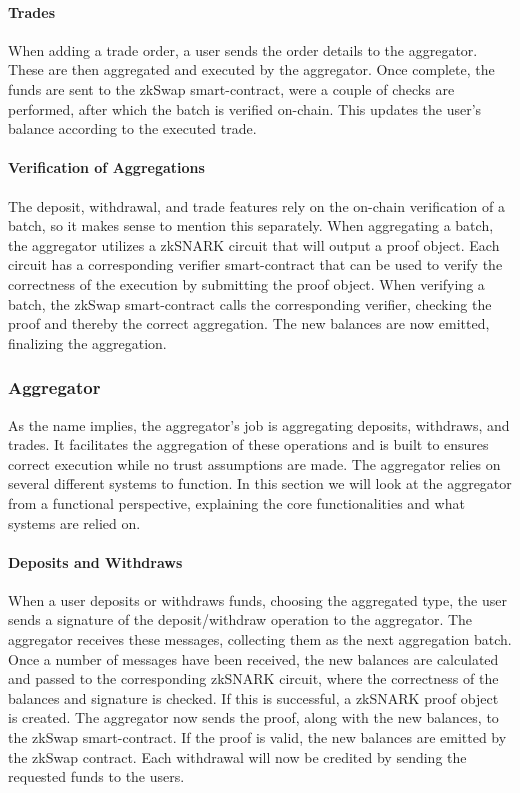 \documentclass[../../thesis.tex]{subfiles}
\begin{document}
\paragraph{Trades}
When adding a trade order, a user sends the order details to the aggregator. These are then aggregated and executed by the aggregator. Once complete, the funds are sent to the zkSwap smart-contract, were a couple of checks are performed, after which the batch is verified on-chain. This updates the user's balance according to the executed trade.

\paragraph{Verification of Aggregations}
The deposit, withdrawal, and trade features rely on the on-chain verification of a batch, so it makes sense to mention this separately. When aggregating a batch, the aggregator utilizes a zkSNARK circuit that will output a proof object. Each circuit has a corresponding verifier smart-contract that can be used to verify the correctness of the execution by submitting the proof object. When verifying a batch, the zkSwap smart-contract calls the corresponding verifier, checking the proof and thereby the correct aggregation. The new balances are now emitted, finalizing the aggregation.

\subsubsection{Aggregator}
As the name implies, the aggregator's job is aggregating deposits, withdraws, and trades. It facilitates the aggregation of these operations and is built to ensures correct execution while no trust assumptions are made. The aggregator relies on several different systems to function. In this section we will look at the aggregator from a functional perspective, explaining the core functionalities and what systems are relied on.

\paragraph{Deposits and Withdraws}
When a user deposits or withdraws funds, choosing the aggregated type, the user sends a signature of the deposit/withdraw operation to the aggregator. The aggregator receives these messages, collecting them as the next aggregation batch. Once a number of messages have been received, the new balances are calculated and passed to the corresponding zkSNARK circuit, where the correctness of the balances and signature is checked. If this is successful, a zkSNARK proof object is created. The aggregator now sends the proof, along with the new balances, to the zkSwap smart-contract. If the proof is valid, the new balances are emitted by the zkSwap contract. Each withdrawal will now be credited by sending the requested funds to the users. 
\end{document}
